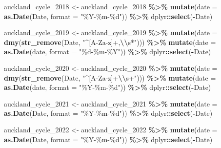 \documentclass[
]{article}
\newenvironment{Shaded}{\begin{snugshade}}{\end{snugshade}}
\newcommand{\AttributeTok}[1]{\textcolor[rgb]{0.13,0.29,0.53}{#1}}
\newcommand{\FunctionTok}[1]{\textcolor[rgb]{0.13,0.29,0.53}{\textbf{#1}}}
\newcommand{\NormalTok}[1]{#1}
\newcommand{\OtherTok}[1]{\textcolor[rgb]{0.56,0.35,0.01}{#1}}
\newcommand{\SpecialCharTok}[1]{\textcolor[rgb]{0.81,0.36,0.00}{\textbf{#1}}}
\newcommand{\StringTok}[1]{\textcolor[rgb]{0.31,0.60,0.02}{#1}}
\begin{document}
\begin{Shaded}
\begin{Highlighting}[]
\NormalTok{auckland\_cycle\_2018 }\OtherTok{\textless{}{-}}\NormalTok{ auckland\_cycle\_2018 }\SpecialCharTok{\%\textgreater{}\%}
  \FunctionTok{mutate}\NormalTok{(}\AttributeTok{date =} \FunctionTok{as.Date}\NormalTok{(Date, }\AttributeTok{format =} \StringTok{"\%Y{-}\%m{-}\%d"}\NormalTok{)) }\SpecialCharTok{\%\textgreater{}\%}
\NormalTok{  dplyr}\SpecialCharTok{::}\FunctionTok{select}\NormalTok{(}\SpecialCharTok{{-}}\NormalTok{Date)}

\NormalTok{auckland\_cycle\_2019 }\OtherTok{\textless{}{-}}\NormalTok{ auckland\_cycle\_2019 }\SpecialCharTok{\%\textgreater{}\%}
  \FunctionTok{mutate}\NormalTok{(}\AttributeTok{date =} \FunctionTok{dmy}\NormalTok{(}\FunctionTok{str\_remove}\NormalTok{(Date, }\StringTok{"\^{}[A{-}Za{-}z]+,}\SpecialCharTok{\textbackslash{}\textbackslash{}}\StringTok{s*"}\NormalTok{))) }\SpecialCharTok{\%\textgreater{}\%}
  \FunctionTok{mutate}\NormalTok{(}\AttributeTok{date =} \FunctionTok{as.Date}\NormalTok{(date, }\AttributeTok{format =} \StringTok{"\%d{-}\%m{-}\%Y"}\NormalTok{)) }\SpecialCharTok{\%\textgreater{}\%}
\NormalTok{  dplyr}\SpecialCharTok{::}\FunctionTok{select}\NormalTok{(}\SpecialCharTok{{-}}\NormalTok{Date)}

\NormalTok{auckland\_cycle\_2020 }\OtherTok{\textless{}{-}}\NormalTok{ auckland\_cycle\_2020 }\SpecialCharTok{\%\textgreater{}\%}
  \FunctionTok{mutate}\NormalTok{(}\AttributeTok{date =} \FunctionTok{dmy}\NormalTok{(}\FunctionTok{str\_remove}\NormalTok{(Date, }\StringTok{"\^{}[A{-}Za{-}z]+}\SpecialCharTok{\textbackslash{}\textbackslash{}}\StringTok{s+"}\NormalTok{))) }\SpecialCharTok{\%\textgreater{}\%}
  \FunctionTok{mutate}\NormalTok{(}\AttributeTok{date =} \FunctionTok{as.Date}\NormalTok{(date, }\AttributeTok{format =} \StringTok{"\%Y{-}\%m{-}\%d"}\NormalTok{)) }\SpecialCharTok{\%\textgreater{}\%}
\NormalTok{  dplyr}\SpecialCharTok{::}\FunctionTok{select}\NormalTok{(}\SpecialCharTok{{-}}\NormalTok{Date)}

\NormalTok{auckland\_cycle\_2021 }\OtherTok{\textless{}{-}}\NormalTok{ auckland\_cycle\_2021 }\SpecialCharTok{\%\textgreater{}\%}
  \FunctionTok{mutate}\NormalTok{(}\AttributeTok{date =} \FunctionTok{as.Date}\NormalTok{(Date, }\AttributeTok{format =} \StringTok{"\%Y{-}\%m{-}\%d"}\NormalTok{)) }\SpecialCharTok{\%\textgreater{}\%}
\NormalTok{  dplyr}\SpecialCharTok{::}\FunctionTok{select}\NormalTok{(}\SpecialCharTok{{-}}\NormalTok{Date)}

\NormalTok{auckland\_cycle\_2022 }\OtherTok{\textless{}{-}}\NormalTok{ auckland\_cycle\_2022 }\SpecialCharTok{\%\textgreater{}\%}
  \FunctionTok{mutate}\NormalTok{(}\AttributeTok{date =} \FunctionTok{as.Date}\NormalTok{(Date, }\AttributeTok{format =} \StringTok{"\%Y{-}\%m{-}\%d"}\NormalTok{)) }\SpecialCharTok{\%\textgreater{}\%}
\NormalTok{  dplyr}\SpecialCharTok{::}\FunctionTok{select}\NormalTok{(}\SpecialCharTok{{-}}\NormalTok{Date)}
\end{Highlighting}
\end{Shaded}
\end{document}
